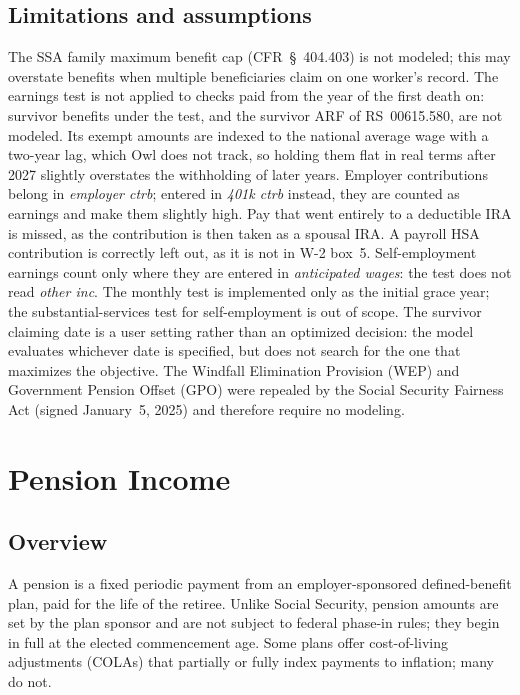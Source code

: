 \documentclass[fleqn,12pt]{report}
\begin{document}
\subsection*{Limitations and assumptions}

The SSA family maximum benefit cap (CFR~§~404.403) is not modeled; this may
overstate benefits when multiple beneficiaries claim on one worker's record.
The earnings test is not applied to checks paid from the year of the first death
on: survivor benefits under the test, and the survivor ARF of
RS~00615.580, are not modeled.
Its exempt amounts are indexed to the national average wage with a two-year lag,
which Owl does not track, so holding them flat in real terms after 2027 slightly
overstates the withholding of later years.
Employer contributions belong in \textit{employer ctrb}; entered in
\textit{401k ctrb} instead, they are counted as earnings and make them slightly
high. Pay that went entirely to a deductible IRA is missed, as the contribution is
then taken as a spousal IRA. A payroll HSA contribution is correctly left out, as it
is not in W-2 box~5.
Self-employment earnings count only where they are entered in
\textit{anticipated wages}: the test does not read \textit{other inc}.
The monthly test is implemented only as the initial grace year; the
substantial-services test for self-employment is out of scope.
The survivor claiming date is a user setting rather than an optimized decision:
the model evaluates whichever date is specified, but does not search for the one
that maximizes the objective.
The Windfall Elimination Provision (WEP) and Government Pension Offset (GPO)
were repealed by the Social Security Fairness Act (signed January~5, 2025) and therefore
require no modeling.

\section{Pension Income}

\subsection*{Overview}

A pension is a fixed periodic payment from an employer-sponsored defined-benefit
plan, paid for the life of the retiree.
Unlike Social Security, pension amounts are set by the plan sponsor and are
not subject to federal phase-in rules; they begin in full at the elected
commencement age.
Some plans offer cost-of-living adjustments (COLAs) that partially or fully
index payments to inflation; many do not.
\end{document}
